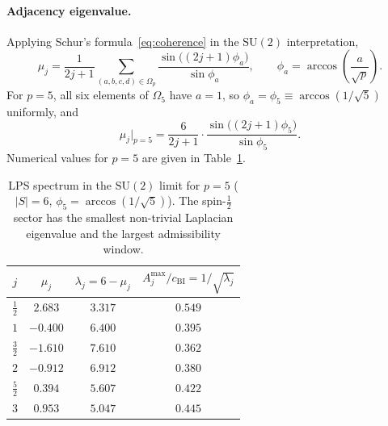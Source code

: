 \documentclass[11pt,a4paper]{article}
\begin{document}
    \paragraph{Adjacency eigenvalue.}
      Applying Schur's formula~\eqref{eq:coherence} in the $\mathrm{SU}(2)$
      interpretation,
    \begin{equation}
      \mu_j = \frac{1}{2j+1}\sum_{(a,b,c,d)\in\Omega_p}
      \frac{\sin\!\bigl((2j+1)\phi_{a}\bigr)}{\sin\phi_{a}},
      \qquad
      \phi_a = \arccos\!\left(\frac{a}{\sqrt{p}}\right).
      \label{eq:mu-lps-su2}
      \end{equation}
      For $p = 5$, all six elements of $\Omega_5$ have $a = 1$, so $\phi_a =
  \phi_5 \equiv \arccos(1/\sqrt{5})$ uniformly, and
    \begin{equation}
      \mu_j\big|_{p=5}
      = \frac{6}{2j+1}\cdot\frac{\sin\!\bigl((2j+1)\phi_5\bigr)}{\sin\phi_5}.
      \label{eq:mu-p5}
      \end{equation}
      Numerical values for $p = 5$ are given in Table~\ref{tab:lps-spectrum-p5}.

    \begin{table}[h]
      \centering
      \renewcommand{\arraystretch}{1.25}
      \begin{tabular}{cccc}
        \hline
        $j$            & $\mu_j$  & $\lambda_j = 6 - \mu_j$ & $A^{\max}_j/c_{\mathrm{BI}} = 1/\!\sqrt{\lambda_j}$ \\
        \hline
        $\tfrac{1}{2}$ & $2.683$  & $3.317$                 & $0.549$                                    \\
        $1$            & $-0.400$ & $6.400$                 & $0.395$                                    \\
        $\tfrac{3}{2}$ & $-1.610$ & $7.610$                 & $0.362$                                    \\
        $2$            & $-0.912$ & $6.912$                 & $0.380$                                    \\
        $\tfrac{5}{2}$ & $0.394$  & $5.607$                 & $0.422$                                    \\
        $3$            & $0.953$  & $5.047$                 & $0.445$                                    \\
        \hline
      \end{tabular}
      \caption{LPS spectrum in the $\mathrm{SU}(2)$ limit for $p = 5$
        ($|S| = 6$, $\phi_5 = \arccos(1/\!\sqrt{5})$).
        The spin-$\tfrac{1}{2}$ sector has the smallest non-trivial Laplacian
        eigenvalue and the largest admissibility window.}
      \label{tab:lps-spectrum-p5}
      \end{table}
\end{document}
